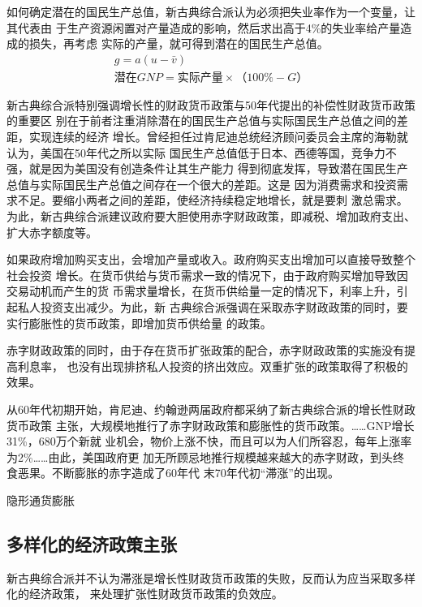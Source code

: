如何确定潜在的国民生产总值，新古典综合派认为必须把失业率作为一个变量，让其代表由
于生产资源闲置对产量造成的影响，然后求出高于4\%的失业率给产量造成的损失，再考虑
实际的产量，就可得到潜在的国民生产总值。
\begin{gather*}
  g = a(u - \bar{v})\\
  潜在GNP=实际产量 \times （100\% - G）
\end{gather*}

新古典综合派特别强调增长性的财政货币政策与50年代提出的补偿性财政货币政策的重要区
别在于前者注重消除潜在的国民生产总值与实际国民生产总值之间的差距，实现连续的经济
增长。曾经担任过肯尼迪总统经济顾问委员会主席的海勒就认为，美国在50年代之所以实际
国民生产总值低于日本、西德等国，竞争力不强，就是因为美国没有创造条件让其生产能力
得到彻底发挥，导致潜在国民生产总值与实际国民生产总值之间存在一个很大的差距。这是
因为消费需求和投资需求不足。要缩小两者之间的差距，使经济持续稳定地增长，就是要刺
激总需求。为此，新古典综合派建议政府要大胆使用赤字财政政策，即减税、增加政府支出、
扩大赤字额度等。

如果政府增加购买支出，会增加产量或收入。政府购买支出增加可以直接导致整个社会投资
增长。在货币供给与货币需求一致的情况下，由于政府购买增加导致因交易动机而产生的货
币需求量增长，在货币供给量一定的情况下，利率上升，引起私人投资支出减少。为此，新
古典综合派强调在采取赤字财政政策的同时，要实行膨胀性的货币政策，即增加货币供给量
的政策。

赤字财政政策的同时，由于存在货币扩张政策的配合，赤字财政政策的实施没有提高利息率，
也没有出现排挤私人投资的挤出效应。双重扩张的政策取得了积极的效果。

从60年代初期开始，肯尼迪、约翰逊两届政府都采纳了新古典综合派的增长性财政货币政策
主张，大规模地推行了赤字财政政策和膨胀性的货币政策。……GNP增长31\%，680万个新就
业机会，物价上涨不快，而且可以为人们所容忍，每年上涨率为2\%……由此，美国政府更
加无所顾忌地推行规模越来越大的赤字财政，到头终食恶果。不断膨胀的赤字造成了60年代
末70年代初“滞涨”的出现。

{\Large 隐形通货膨胀}

\subsection{多样化的经济政策主张}

新古典综合派并不认为滞涨是增长性财政货币政策的失败，反而认为应当采取多样化的经济政策，
来处理扩张性财政货币政策的负效应。

